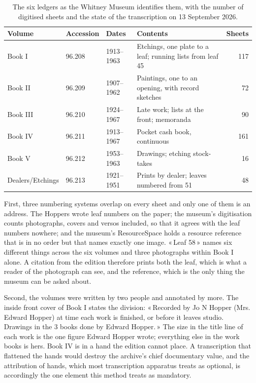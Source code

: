 \documentclass[11pt]{article}
\newcommand{\q}[1]{«\,#1\,»}
\begin{document}
\begin{table}[htbp]\centering\small
\caption{The six ledgers as the Whitney Museum identifies them, with the number of digitised sheets and the state of the transcription on 13 September 2026.}\label{tab:corpus}
\begin{tabular}{llllr}\toprule
Volume & Accession & Dates & Contents & Sheets\\\midrule
Book I & 96.208 & 1913--1963 & Etchings, one plate to a leaf; running lists from leaf 45 & 117\\
Book II & 96.209 & 1907--1962 & Paintings, one to an opening, with record sketches & 72\\
Book III & 96.210 & 1924--1967 & Late work; lists at the front; memoranda & 90\\
Book IV & 96.211 & 1913--1967 & Pocket cash book, continuous & 161\\
Book V & 96.212 & 1953--1963 & Drawings; etching stock-takes & 16\\
Dealers/Etchings & 96.213 & 1921--1951 & Prints by dealer; leaves numbered from 51 & 48\\\bottomrule
\end{tabular}
\end{table}

First, three numbering systems overlap on every sheet and only one of them is an address. The Hoppers wrote leaf numbers on the paper; the museum's digitisation counts photographs, covers and versos included, so that it agrees with the leaf numbers nowhere; and the museum's ResourceSpace holds a resource reference that is in no order but that names exactly one image. \q{Leaf 58} names six different things across the six volumes and three photographs within Book I alone. A citation from the edition therefore prints both the leaf, which is what a reader of the photograph can see, and the reference, which is the only thing the museum can be asked about.

Second, the volumes were written by two people and annotated by more. The inside front cover of Book I states the division: \q{Recorded by Jo N Hopper (Mrs. Edward Hopper) at time each work is finished, or before it leaves studio. Drawings in the 3 books done by Edward Hopper.} The size in the title line of each work is the one figure Edward Hopper wrote; everything else in the work books is hers. Book IV is in a hand the edition cannot place. A transcription that flattened the hands would destroy the archive's chief documentary value, and the attribution of hands, which most transcription apparatus treats as optional, is accordingly the one element this method treats as mandatory.
\end{document}
